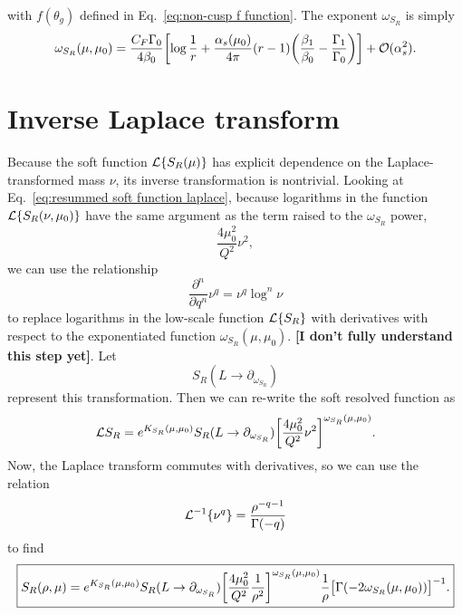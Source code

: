 \documentclass[11pt,twoside,reqno]{amsart}
\theoremstyle{plain}
\theoremstyle{remark}
\theoremstyle{definition}
\theoremstyle{remark}
\theoremstyle{definition}
\theoremstyle{definition}
\newcommand{\cL}{\mathcal{L}}
\newcommand{\cO}{\mathcal{O}}
\begin{document}
	with $f(\theta_g)$ defined in Eq.~\ref{eq:non-cusp f function}. The exponent $\omega_{S_R}$ is simply
	\begin{equation}
		\omega_{S_R}(\mu, \mu_0) = \frac{C_F \Gamma_0}{4\beta_0}\qty[\log \frac{1}{r} + \frac{\alpha_s(\mu_0)}{4\pi}(r - 1)\qty(\frac{\beta_1}{\beta_0} - \frac{\Gamma_1}{\Gamma_0})] + \cO(\alpha_s^2).
	\end{equation}

\section{Inverse Laplace transform}
	Because the soft function $\cL\qty{S_R(\mu)}$ has explicit dependence on the Laplace-transformed mass $\nu$, its inverse transformation is nontrivial. Looking at Eq.~\ref{eq:resummed soft function laplace}, because logarithms in the function $\cL\qty{S_R(\nu, \mu_0)}$ have the same argument as the term raised to the $\omega_{S_R}$ power,
	\begin{equation}
		\frac{4\mu_0^2}{Q^2}\nu^2,
	\end{equation}
	we can use the relationship \cite{frye_factorization_2016,becher_factorization_2007}
	\begin{equation}
		\frac{\partial^n}{\partial q^n}\nu^q = \nu^q \log^n \nu
	\end{equation}
	to replace logarithms in the low-scale function $\cL\qty{S_R}$ with derivatives with respect to the exponentiated function $\omega_{S_R}(\mu, \mu_0)$. {\color{red}\textbf{[I don't fully understand this step yet]}}. Let
	\begin{equation}
		S_R(L \to \partial_{\omega_{S_R}})
	\end{equation}
	represent this transformation. Then we can re-write the soft resolved function as
	\begin{equation}
		\cL{S_R} = e^{K_{S_R}(\mu, \mu_0)}S_R(L \to \partial_{\omega_{S_R}}) \qty[\frac{4\mu_0^2}{Q^2}\nu^2]^{\omega_{S_R}(\mu, \mu_0)}.
	\end{equation}
	Now, the Laplace transform commutes with derivatives, so we can use the relation \cite{frye_factorization_2016}
	\begin{equation}
		\cL^{-1}\qty{\nu^q} = \frac{\rho^{-q-1}}{\Gamma(-q)}
	\end{equation}
	to find
	\begin{equation}
		\boxed{S_R(\rho, \mu) = e^{K_{S_R}(\mu, \mu_0)}S_R(L \to \partial_{\omega_{S_R}}) \qty[\frac{4\mu_0^2}{Q^2}\frac{1}{\rho^2}]^{\omega_{S_R}(\mu, \mu_0)} \frac{1}{\rho} \qty\big[\Gamma\qty(-2\omega_{S_R}(\mu, \mu_0))]^{-1}.}
	\end{equation}
\end{document}
